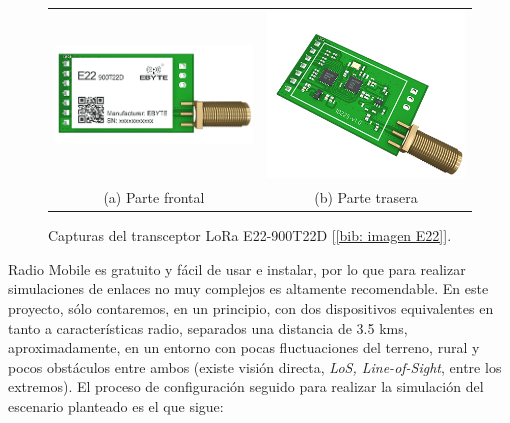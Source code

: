\documentclass[12pt]{article}
\begin{document}
	\begin{figure}[h]
		\begin{center}
			\begin{tabular}{cc}
				\includegraphics[width=60mm]{img/e22_front.png} &   \includegraphics[width=60mm]{img/e22_rear.png} \\
				(a) Parte frontal & (b) Parte trasera\\[6pt]
			\end{tabular}
			\caption{Capturas del transceptor LoRa E22-900T22D [\ref{bib: imagen E22}].}
			\label{fig: capturas E22.}
		\end{center}
	\end{figure}

	\noindent Radio Mobile es gratuito y fácil de usar e instalar, por lo que para realizar simulaciones de enlaces no muy complejos es altamente recomendable. En este proyecto, sólo contaremos, en un principio, con dos dispositivos equivalentes en tanto a características radio, separados una distancia de 3.5 kms, aproximadamente, en un entorno con pocas fluctuaciones del terreno, rural y pocos obstáculos entre ambos (existe visión directa, \textit{LoS, Line-of-Sight}, entre los extremos). El proceso de configuración seguido para realizar la simulación del escenario planteado es el que sigue: \\
	
\end{document}

